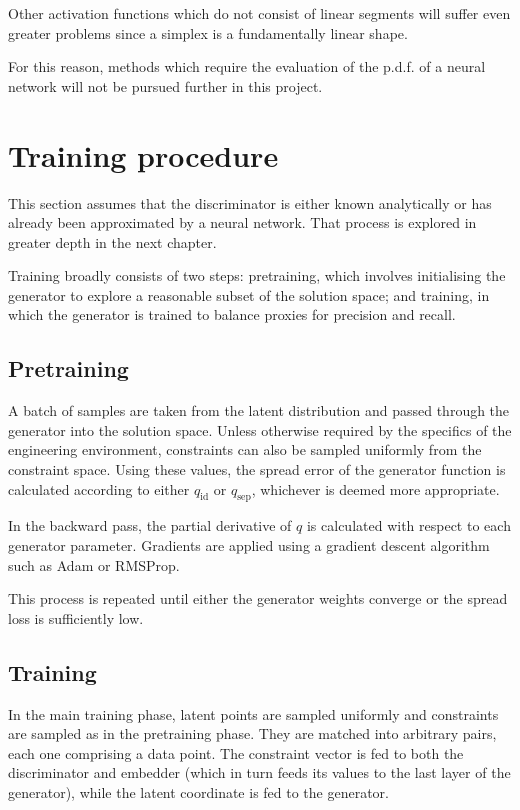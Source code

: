 \documentclass[../../main.tex]{subfiles}
\begin{document}
Other activation functions which do not consist of linear segments will suffer even greater problems since a simplex is a fundamentally linear shape.

For this reason, methods which require the evaluation of the p.d.f. of a neural network will not be pursued further in this project.

\section{Training procedure} \label{section:generatorTrainingProcedure}

This section assumes that the discriminator is either known analytically or has already been approximated by a neural network.
That process is explored in greater depth in the next chapter.

Training broadly consists of two steps: pretraining, which involves initialising the generator to explore a reasonable subset of the solution space; and training, in which the generator is trained to balance proxies for precision and recall.

\subsection{Pretraining} \label{subsection:pretraining}

A batch of samples are taken from the latent distribution and passed through the generator into the solution space.
Unless otherwise required by the specifics of the engineering environment, constraints can also be sampled uniformly from the constraint space.
Using these values, the spread error of the generator function is calculated according to either $q_\text{id}$ or $q_\text{sep}$, whichever is deemed more appropriate.

In the backward pass, the partial derivative of $q$ is calculated with respect to each generator parameter.
Gradients are applied using a gradient descent algorithm such as Adam or RMSProp.

This process is repeated until either the generator weights converge or the spread loss is sufficiently low.

\subsection{Training} \label{subsection:training}

In the main training phase, latent points are sampled uniformly and constraints are sampled as in the pretraining phase.
They are matched into arbitrary pairs, each one comprising a data point.
The constraint vector is fed to both the discriminator and embedder (which in turn feeds its values to the last layer of the generator), while the latent coordinate is fed to the generator.
\end{document}
